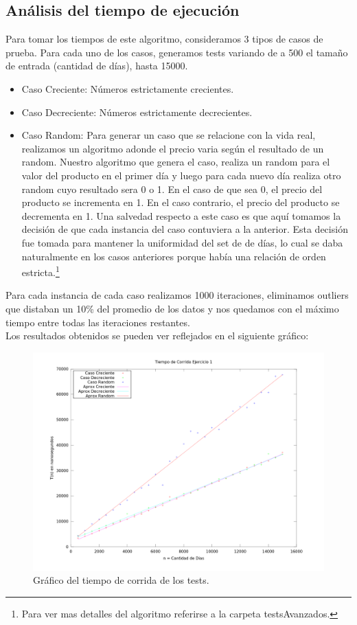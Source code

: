 \subsection{Análisis del tiempo de ejecución}

\indent Para tomar los tiempos de este algoritmo, consideramos 3 tipos de casos
de prueba. Para cada uno de los casos, generamos tests variando de a 500 el
tamaño de entrada (cantidad de días), hasta 15000.

\begin{itemize}
 \item Caso Creciente: Números estrictamente crecientes.
 \item Caso Decreciente: Números estrictamente decrecientes.
 \item Caso Random: Para generar un caso que se relacione con la vida real,
realizamos un algoritmo adonde el precio varia según el resultado de un
random. Nuestro algoritmo que genera el caso, realiza un random para el valor
del producto en el primer día y luego para cada nuevo día realiza otro random
cuyo resultado sera 0 o 1. En el caso de que sea 0, el precio del producto se
incrementa en 1. En el caso contrario, el precio del producto se decrementa en
1. Una salvedad respecto a este caso es que aquí tomamos la decisión de que cada
instancia del caso contuviera a la anterior. Esta decisión fue
tomada para mantener la uniformidad del set de de días, lo cual se daba
naturalmente en los casos
anteriores porque había una relación de orden estricta.\footnote{Para ver mas
detalles del algoritmo referirse a la carpeta
testsAvanzados.}
\end{itemize}

\indent Para cada instancia de cada caso realizamos 1000 iteraciones, eliminamos
outliers que distaban un 10\% del promedio de los datos y nos quedamos con el
máximo tiempo entre todas las iteraciones
restantes.\\
\indent Los resultados obtenidos se pueden ver reflejados en el
siguiente gráfico:

\begin{figure}[h]
\centering                                                       
        \includegraphics[width=420pt]{./figs/ej1.png}
	\caption{Gráfico del tiempo de corrida de los tests.}
	\label{fig:p1tiempos}
\end{figure}


